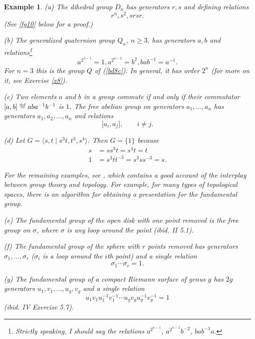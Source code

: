 \documentclass[a4paper,11pt,final,openany]{memoir}%
\newtheorem{example}[X]{Example}
\theoremstyle{nonumberplain}
\begin{document}
\begin{example}
\label{fg08} (a) The dihedral group $D_{n}$ has generators $r,s$ and defining
relations
\[
r^{n},s^{2},srsr.
\]
(See \ref{fg10} below for a proof.)

(b) The \emph{generalized quaternion group}%
$Q_{n}$, $n\geq3$, has generators $a,b$ and relations\footnote{Strictly
speaking, I should say the relations $a^{2^{n-1}}$, $a^{2^{n-2}}b^{-2}$,
$bab^{-1}a$.}
\[
a^{2^{n-1}}=1,a^{2^{n-2}}=b^{2},bab^{-1}=a^{-1}.
\]
For $n=3$ this is the group $Q$ of (\ref{bd8c}). In general, it has order
$2^{n}$ (for more on it, see Exercise \ref{x8}).

(c) Two elements $a$ and $b$ in a group commute if and only if their
\emph{commutator}%
$[a,b]\overset{\df}{=}aba^{-1}b^{-1}$ is $1$. The \emph{free
abelian\/ group}%
on generators $a_{1},\ldots,a_{n}$ has generators $a_{1},a_{2},\ldots,a_{n}$
and relations
\[
\lbrack a_{i},a_{j}],\qquad i\neq j.
\]


(d) Let $G=\langle s,t\mid s^{3}t,t^{3},s^{4}\rangle$. Then $G=\{1\}$ because%
\begin{align*}
s  &  =ss^{3}t=s^{4}t=t\\
1  &  =s^{3}tt^{-3}=s^{3}ss^{-3}=s.
\end{align*}


For the remaining examples, see \cite{massey1967}, which contains a good
account of the interplay between group theory and topology. For example, for
many types of topological spaces, there is an algorithm for obtaining a
presentation for the fundamental group.

(e) The fundamental group of the open disk with one point removed is the free
group on $\sigma$, where $\sigma$ is any loop around the point (ibid. II 5.1).

(f) The fundamental group of the sphere with $r$ points removed has generators
$\sigma_{1},...,\sigma_{r}$ ($\sigma_{i}$ is a loop around the $i$th point)
and a single relation
\[
\sigma_{1}\cdots\sigma_{r}=1.
\]


(g) The fundamental group of a compact Riemann surface of genus $g$ has $2g$
generators $u_{1},v_{1},...,u_{g},v_{g}$ and a single relation
\[
u_{1}v_{1}u_{1}^{-1}v_{1}^{-1}\cdots u_{g}v_{g}u_{g}^{-1}v_{g}^{-1}=1
\]
(ibid. IV Exercise 5.7).
\end{example}
\end{document}

